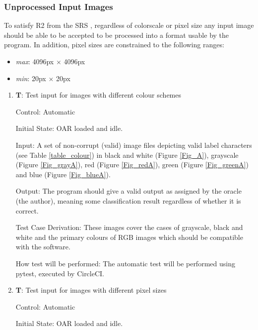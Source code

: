 \documentclass[12pt, titlepage]{article}
\newcounter{testnum} %
\begin{document}
\subsubsection{Unprocessed Input Images}
To satisfy R2 from the SRS \citep{SRS}, regardless of colorscale or pixel size any input image should be able to be accepted to 
be processed into a format usable by the program. In addition, pixel sizes are constrained to the following ranges:

\begin{itemize}
  \item{\textit{max}: 4096px $\times$ 4096px}
  \item{\textit{min}: 20px $\times$ 20px}
\end{itemize}

\begin{enumerate}

  \item{\textbf{T\thetestnum \label{T_inputColour}}: Test input for images with different colour schemes\\}
            
  Control: Automatic
            
  Initial State: OAR loaded and idle.
            
  Input: A set of non-corrupt (valid) image files depicting valid label characters (see Table \ref{table_colour}) in black and white (Figure \ref{Fig_A}), 
  grayscale (Figure \ref{Fig_grayA}), red (Figure \ref{Fig_redA}), green (Figure \ref{Fig_greenA}) and blue (Figure \ref{Fig_blueA}).

  
  Output:  The program should give a valid output as assigned by the oracle (the author), meaning some classification result regardless
  of whether it is correct.
            
  Test Case Derivation: These images cover the cases of grayscale, black and white and the primary colours of RGB images which should be compatible with the software.
            
  How test will be performed: The automatic test will be performed using pytest, executed by CircleCI.

  \item{\textbf{T\thetestnum \label{T_inputSize}}: Test input for images with different pixel sizes\\}
            
  Control: Automatic
            
  Initial State: OAR loaded and idle.
            

\end{enumerate}
\end{document}
